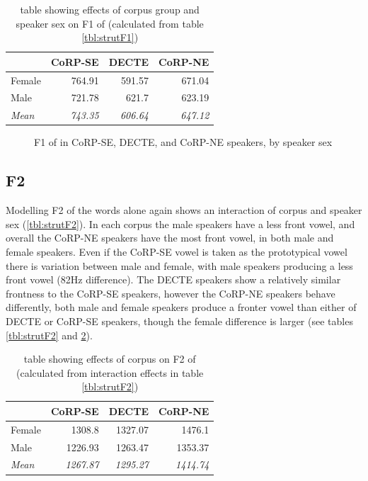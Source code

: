\documentclass[../../../00.FullDoc/tex/ThesisSkeleton-draft2]{subfiles}
\begin{document}
\begin{table}[htbp]
	\centering
	\begin{tabular}{lrrr}
		\hline
		& \multicolumn{1}{l}{CoRP-SE} & \multicolumn{1}{l}{DECTE} & \multicolumn{1}{l}{CoRP-NE} \\
		\hline
		Female & 764.91 & 591.57 & 671.04 \\
		Male  & 721.78 & 621.7 & 623.19 \\
		\textit{Mean} & \textit{743.35} & \textit{606.64} & \textit{647.12} \\
		\hline
	\end{tabular}%
	\caption{table showing effects of corpus group and speaker sex on F1 of \strutt{} (calculated from table \ref{tbl:strutF1})}
	\label{tbl:strutF1inter}%
\end{table}%

\begin{figure}[h]
	
	\caption{F1 of \strutt{} in CoRP-SE, DECTE, and CoRP-NE speakers, by speaker sex} \label{fig:strutF1-sex}
\end{figure}


\subsection{F2}
Modelling F2 of the \strutt{} words alone again shows an interaction of corpus and speaker sex (\ref{tbl:strutF2}). In each corpus the male speakers have a less front vowel, and overall the CoRP-NE speakers have the most front vowel, in both male and female speakers. Even if the CoRP-SE vowel is taken as the prototypical \strutt{} vowel there is variation between male and female, with male speakers producing a less front vowel (82Hz difference). The DECTE speakers show a relatively similar frontness to the CoRP-SE speakers, however the CoRP-NE speakers behave differently, both male and female speakers produce a fronter \strutt{} vowel than either of DECTE or CoRP-SE speakers, though the female difference is larger (see tables \ref{tbl:strutF2} and \ref{tbl:strutF2-inter}).


\begin{table}[htbp]
	\centering
	\begin{tabular}{lrrr}
		\hline
		& \multicolumn{1}{l}{CoRP-SE} & \multicolumn{1}{l}{DECTE} & \multicolumn{1}{l}{CoRP-NE} \\
		\hline
		Female & 1308.8 & 1327.07 & 1476.1 \\
		Male  & 1226.93 & 1263.47 & 1353.37 \\
		\textit{Mean} & \textit{1267.87} & \textit{1295.27} & \textit{1414.74} \\
		\hline
	\end{tabular}%
	\caption{table showing effects of corpus on F2 of \strutt{} (calculated from interaction effects in table \ref{tbl:strutF2})}
	\label{tbl:strutF2-inter}%
\end{table}%
\end{document}
